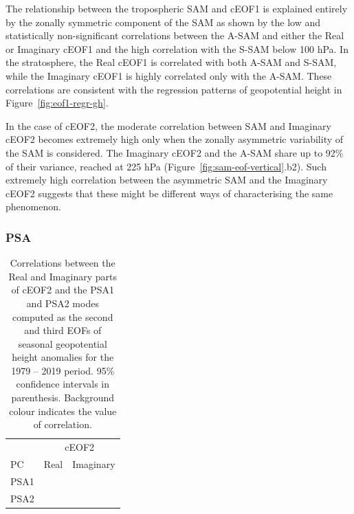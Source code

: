 \documentclass[smallextended]{svjour3}       %
\begin{document}
The relationship between the tropospheric SAM and cEOF1 is explained entirely by the zonally symmetric component of the SAM as shown by the low and statistically non-significant correlations between the A-SAM and either the Real or Imaginary cEOF1 and the high correlation with the S-SAM below 100 hPa.
In the stratosphere, the Real cEOF1 is correlated with both A-SAM and S-SAM, while the Imaginary cEOF1 is highly correlated only with the A-SAM.
These correlations are consistent with the regression patterns of geopotential height in Figure~\ref{fig:eof1-regr-gh}.

In the case of cEOF2, the moderate correlation between SAM and Imaginary cEOF2 becomes extremely high only when the zonally asymmetric variability of the SAM is considered.
The Imaginary cEOF2 and the A-SAM share up to 92\% of their variance, reached at 225 hPa (Figure~\ref{fig:sam-eof-vertical}.b2).
Such extremely high correlation between the asymmetric SAM and the Imaginary cEOF2 suggests that these might be different ways of characterising the same phenomenon.

\hypertarget{psa}{%
\subsubsection{PSA}\label{psa}}




\begin{table}

\caption{\label{tab:psa-eof2}Correlations between the Real and Imaginary parts of cEOF2 and the PSA1 and PSA2 modes computed as the second and third EOFs of seasonal geopotential height anomalies \citep[following][]{mo2001} for the 1979 -- 2019 period. 95\% confidence intervals in parenthesis.
Background colour indicates the value of correlation.}
\centering
\begin{tabular}[t]{l>{}l>{}l}
\toprule
\multicolumn{1}{c}{} & \multicolumn{2}{c}{cEOF2} \\
\cmidrule(l{3pt}r{3pt}){2-3}
PC & Real & Imaginary\\
\midrule
PSA1 & \cellcolor[HTML]{C3BBDE}{\textcolor{black}{-0.32 (CI: -0.57 -- -0.015)}} & \cellcolor[HTML]{6259AA}{\textcolor{white}{-0.82 (CI: -0.9 -- -0.69)}}\\
PSA2 & \cellcolor[HTML]{9E4E47}{\textcolor{white}{0.81 (CI: 0.67 -- 0.9)}} & \cellcolor[HTML]{F3F2F8}{\textcolor{black}{-0.062 (CI: -0.36 -- 0.25)}}\\
\bottomrule
\end{tabular}
\end{table}
\end{document}
